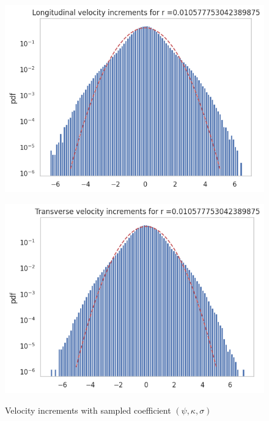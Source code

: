 \documentclass[a4paper,12pt]{article}
\theoremstyle{definition}
\begin{document}
\begin{figure}[H]
    \centering
    \begin{minipage}{0.48\textwidth}
        \centering
        \includegraphics[width=\linewidth]{VelIncrPSIKAPPASIGMA/GenIncrLong.png}
        \label{fig:GenIncrLong3}
    \end{minipage}\hfill
    \begin{minipage}{0.48\textwidth}
        \centering
        \includegraphics[width=\linewidth]{VelIncrPSIKAPPASIGMA/GenIncrTrans.png}
        \label{fig:GenIncrTrans3}
    \end{minipage}
    \caption{Velocity increments with sampled coefficient \((\psi,\kappa,\sigma)\)}
\end{figure}
\end{document}
